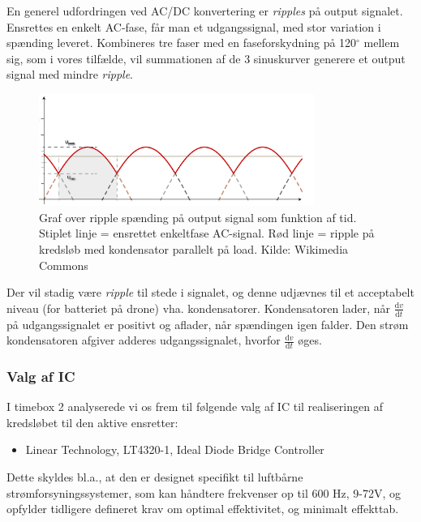 En generel udfordringen ved AC/DC konvertering er \textit{ripples} på output signalet. Ensrettes en enkelt AC-fase, får man et udgangssignal, med stor variation i spænding leveret. Kombineres tre faser med en faseforskydning på 120$^\circ$ mellem sig, som i vores tilfælde, vil summationen af de 3 sinuskurver generere et output signal med mindre \textit{ripple}.

\begin{figure}[h]
  \centering
  \includegraphics[width=0.8\textwidth]{prens2.png}
  \caption{Graf over ripple spænding på output signal som funktion af tid. Stiplet linje = ensrettet enkeltfase
AC-signal. Rød linje = ripple på kredsløb med kondensator parallelt på load. Kilde: Wikimedia Commons}
  \label{fig:prens2}
\end{figure}

Der vil stadig være \textit{ripple} til stede i signalet, og denne udjævnes til et acceptabelt niveau (for batteriet på drone) vha. kondensatorer. Kondensatoren lader, når $\frac{\mathrm{d}v}{\mathrm{d}t}$ på udgangssignalet er positivt og aflader, når spændingen igen falder. Den strøm kondensatoren afgiver adderes udgangssignalet, hvorfor $\frac{\mathrm{d}v}{\mathrm{d}t}$ øges.

\subsubsection{Valg af IC }
\label{sec:valg-af-ic}

I timebox 2 analyserede vi os frem til følgende valg af IC til realiseringen af kredsløbet til den aktive ensretter:
\begin{itemize}
\item Linear Technology, LT4320-1, Ideal Diode Bridge Controller
\end{itemize}

Dette skyldes bl.a., at den er designet specifikt til luftbårne strømforsyningssystemer, som kan håndtere frekvenser op til 600 Hz, 9-72V, og opfylder tidligere defineret krav om optimal effektivitet, og minimalt effekttab.

